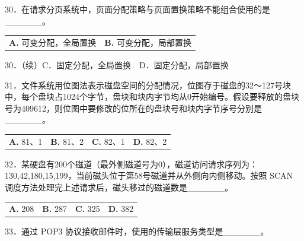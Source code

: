\documentclass[UTF8,11pt]{ctexart}
\begin{document}
30．在请求分页系统中，页面分配策略与页面置换策略不能组合使用的是\_\_\_\_\_\_。


\begin{center}\begin{tabular}{>{\raggedright\arraybackslash}p{\dimexpr(\linewidth-4\tabcolsep)/2\relax}>{\raggedright\arraybackslash}p{\dimexpr(\linewidth-4\tabcolsep)/2\relax}}
\textbf{A.} 可变分配，全局置换 & \textbf{B.} 可变分配，局部置换\\[.35em]\end{tabular}\end{center}

30．（续）C．固定分配，全局置换　D．固定分配，局部置换


31．文件系统用位图法表示磁盘空间的分配情况，位图存于磁盘的32～127号块中，每个盘块占1024个字节，盘块和块内字节均从0开始编号。假设要释放的盘块号为409612，则位图中要修改的位所在的盘块号和块内字节序号分别是\_\_\_\_\_\_。


\begin{center}\begin{tabular}{>{\raggedright\arraybackslash}p{\dimexpr(\linewidth-8\tabcolsep)/4\relax}>{\raggedright\arraybackslash}p{\dimexpr(\linewidth-8\tabcolsep)/4\relax}>{\raggedright\arraybackslash}p{\dimexpr(\linewidth-8\tabcolsep)/4\relax}>{\raggedright\arraybackslash}p{\dimexpr(\linewidth-8\tabcolsep)/4\relax}}
\textbf{A.} 81、1 & \textbf{B.} 81、2 & \textbf{C.} 82、1 & \textbf{D.} 82、2\\[.35em]\end{tabular}\end{center}

32．某硬盘有200个磁道（最外侧磁道号为0），磁道访问请求序列为：130,42,180,15,199，当前磁头位于第58号磁道并从外侧向内侧移动。按照 SCAN 调度方法处理完上述请求后，磁头移过的磁道数是\_\_\_\_\_\_。


\begin{center}\begin{tabular}{>{\raggedright\arraybackslash}p{\dimexpr(\linewidth-8\tabcolsep)/4\relax}>{\raggedright\arraybackslash}p{\dimexpr(\linewidth-8\tabcolsep)/4\relax}>{\raggedright\arraybackslash}p{\dimexpr(\linewidth-8\tabcolsep)/4\relax}>{\raggedright\arraybackslash}p{\dimexpr(\linewidth-8\tabcolsep)/4\relax}}
\textbf{A.} 208 & \textbf{B.} 287 & \textbf{C.} 325 & \textbf{D.} 382\\[.35em]\end{tabular}\end{center}

33．通过 POP3 协议接收邮件时，使用的传输层服务类型是\_\_\_\_\_\_。
\end{document}
